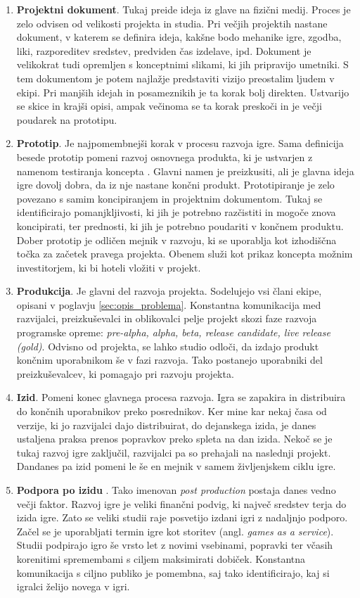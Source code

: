 \documentclass[12pt,a4paper,twoside]{book}
\begin{document}
\begin{enumerate}
	\item \textbf{Projektni dokument}. Tukaj preide ideja iz glave na fizični medij. Proces je zelo odvisen od velikosti projekta in studia. Pri večjih projektih nastane dokument, v katerem se definira ideja, kakšne bodo mehanike igre, zgodba, liki, razporeditev sredstev, predviden čas izdelave, ipd. Dokument je velikokrat tudi opremljen s konceptnimi slikami, ki jih pripravijo umetniki. S tem dokumentom je potem najlažje predstaviti vizijo preostalim ljudem v ekipi. Pri manjših idejah in posameznikih je ta korak bolj direkten. Ustvarijo se skice in krajši opisi, ampak večinoma se ta korak preskoči in je večji poudarek na prototipu.
	\item \textbf{Prototip}. Je najpomembnejši korak v procesu razvoja igre. Sama definicija besede prototip pomeni razvoj osnovnega produkta, ki je ustvarjen z namenom testiranja koncepta \cite{blackwell2015prototype}. Glavni namen je preizkusiti, ali je glavna ideja igre dovolj dobra, da iz nje nastane končni produkt. Prototipiranje je zelo povezano s samim koncipiranjem in projektnim dokumentom. Tukaj se identificirajo pomanjkljivosti, ki jih je potrebno razčistiti in mogoče znova koncipirati, ter prednosti, ki jih je potrebno poudariti v končnem produktu. Dober prototip je odličen mejnik v razvoju, ki se uporablja kot izhodiščna točka za začetek pravega projekta. Obenem služi kot prikaz koncepta možnim investitorjem, ki bi hoteli vložiti v projekt. 
	\item \textbf{Produkcija}. Je glavni del razvoja projekta. Sodelujejo vsi člani ekipe, opisani v poglavju \ref{sec:opis_problema}. Konstantna komunikacija med razvijalci, preizkuševalci in oblikovalci pelje projekt skozi faze razvoja programske opreme: \textit{pre-alpha, alpha, beta, release candidate, live release (gold)}. Odvisno od projekta, se lahko studio odloči, da izdajo produkt končnim uporabnikom še v fazi razvoja. Tako postanejo uporabniki del preizkuševalcev, ki pomagajo pri razvoju projekta.
	\item \textbf{Izid}. Pomeni konec glavnega procesa razvoja. Igra se zapakira in distribuira do končnih uporabnikov preko posrednikov. Ker mine kar nekaj časa od verzije, ki jo razvijalci dajo distribuirat, do dejanskega izida, je danes ustaljena praksa prenos popravkov preko spleta na dan izida. Nekoč se je tukaj razvoj igre zaključil, razvijalci pa so prehajali na naslednji projekt. Dandanes pa izid pomeni le še en mejnik v samem življenjskem ciklu igre.
	\item \textbf{Podpora po izidu} . Tako imenovan \textit{post production} postaja danes vedno večji faktor. Razvoj igre je veliki finančni podvig, ki največ sredstev terja do izida igre. Zato se veliki studii raje posvetijo izdani igri z nadaljnjo podporo. Začel se je uporabljati termin igre kot storitev (angl. \textit{games as a service}). Studii podpirajo igro še vrsto let z novimi vsebinami, popravki ter včasih korenitimi spremembami s ciljem maksimirati dobiček. Konstantna komunikacija s ciljno publiko je pomembna, saj tako identificirajo, kaj si igralci želijo novega v igri.
\end{enumerate}
\end{document}

